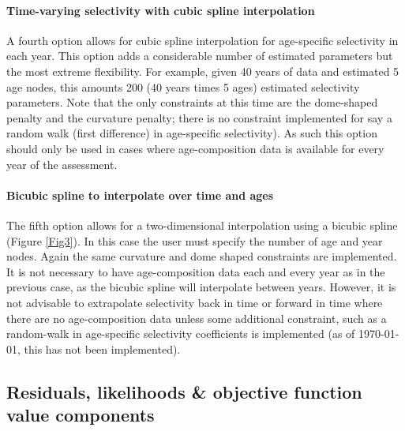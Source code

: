 \paragraph{Time-varying selectivity with cubic spline interpolation} A fourth option allows for cubic spline interpolation for age-specific selectivity  in each year.  This option adds a considerable number of estimated parameters but the most extreme flexibility.  For example, given 40 years of data and estimated 5 age nodes, this amounts 200 (40 years times 5 ages) estimated selectivity parameters.  Note that the only constraints at this time are the dome-shaped penalty and the curvature penalty; there is no constraint implemented for say a random walk (first difference) in age-specific selectivity).  As such this option should only be used in cases where age-composition data is available for every year of the assessment.

\paragraph{Bicubic spline to interpolate over time and ages}  The fifth option allows for a two-dimensional interpolation using a bicubic spline (Figure \ref{Fig3}).  In this case the user must specify the number of age and year nodes.  Again the same curvature and dome shaped constraints are implemented.  It is not necessary to have age-composition data each and every year as in the previous case, as the bicubic spline will interpolate between years.  However, it is not advisable to extrapolate selectivity back in time or forward in time where there are no age-composition data unless some additional constraint, such as a random-walk in age-specific selectivity coefficients is implemented (as of \today, this has not been implemented).

	

\subsection{Residuals, likelihoods \& objective function value components}

